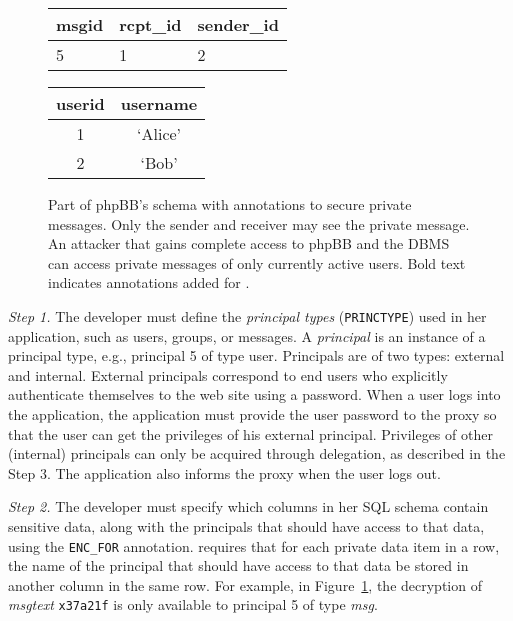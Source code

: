 \begin{figure}[t!]
\begin{framed}
\begin{minipage}[h]{1.7 in}
  \smallskip

  \begin{tabular}{p{0.8cm}|p{1cm}|p{0.8cm}}
  msgid & rcpt\_id  & sender\_id \\ \hline
  5 & 1 & 2 \\ 
  \end{tabular}
\end{minipage}
\hspace{0mm}
\begin{minipage}[h]{0.9in}
 \centering
  \begin{tabular}{c|c}
  userid & username \\ \hline
  1 & `Alice'  \\  
  2 & `Bob' 
  \end{tabular}
 \end{minipage}
\end{framed}

\caption{
Part of phpBB's schema with annotations to secure private messages.
Only the sender and receiver may see the private message. An attacker
that gains complete access to phpBB and the DBMS can access
private messages of only currently active users.  Bold text indicates
annotations added for \name.
    }
\label{fig:privmsg}
\end{figure}

{\em Step 1.} The developer must define the {\em principal types}
({\small \tt PRINCTYPE}) used in her application, such as users,
groups, or messages.  A {\em principal} is an instance of a principal
type, e.g., principal 5 of type user.  Principals are of two types:
external and internal. External principals correspond to end users who
explicitly authenticate themselves to the web site using a password.
When a user logs into the application, the application must provide
the user password to the \name proxy so that the user can get the
privileges of his external principal.  Privileges of other (internal)
principals can only be acquired through delegation, as described in
the Step 3.  The application also informs the proxy when the user logs
out.

{\em Step 2.} The developer must specify which columns in her SQL
schema contain sensitive data, along with the principals that should
have access to that data, using the {\tt \small ENC\_FOR}
annotation.  \name requires that for each private data item in a row,
the name of the principal that should have access to that data be
stored in another column in the same row.
For example, in Figure~\ref{fig:privmsg}, the decryption of {\em msgtext}
\texttt{x37a21f} is only available to principal 5 of type {\em msg}.

